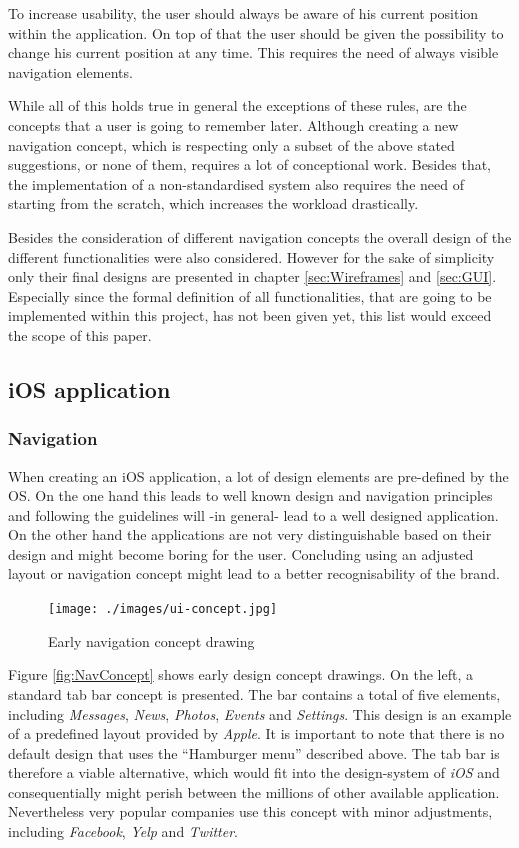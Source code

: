 To increase usability, the user should always be aware of his current position within the application. On top of that the user should be given the possibility to change his current position at any time. This requires the need of always visible navigation elements. 

While all of this holds true in general the exceptions of these rules, are the concepts that a user is going to remember later. Although creating a new navigation concept, which is respecting only a subset of the above stated suggestions, or none of them, requires a lot of conceptional work. Besides that, the implementation of a non-standardised system also requires the need of starting from the scratch, which increases the workload drastically. \cite{Hampton-Smith:2013aa}

Besides the consideration of different navigation concepts the overall design of the different functionalities were also considered. However for the sake of simplicity only their final designs are presented in chapter \vref{sec:Wireframes} and \vref{sec:GUI}. Especially since the formal definition of all functionalities, that are going to be implemented within this project, has not been given yet, this list would exceed the scope of this paper.

\subsection{iOS application}
\subsubsection{Navigation}
When creating an iOS application, a lot of design elements are pre-defined by the \acrlong{OS}. On the one hand this leads to well known design and navigation principles and following the guidelines will -in general- lead to a well designed application. On the other hand the applications are not very distinguishable based on their design and might become boring for the user. Concluding using an adjusted layout or navigation concept might lead to a better recognisability of the brand. 

\begin{figure}[h]
  	\centering
  	\texttt{[image: ./images/ui-concept.jpg]}
  	\caption[Early navigation concept drawing, own figure]{Early navigation concept drawing}
	\label{fig:NavConcept}
\end{figure}

Figure \vref{fig:NavConcept} shows early design concept drawings. On the left, a standard tab bar concept is presented. The bar contains a total of five elements, including \emph{Messages}, \emph{News}, \emph{Photos}, \emph{Events} and \emph{Settings}. This design is an example of a predefined layout provided by \emph{Apple}. It is important to note that there is no default design that uses the \enquote{Hamburger menu} described above. The tab bar is therefore a viable alternative, which would fit into the design-system of \emph{iOS} and consequentially might perish between the millions of other available application. Nevertheless very popular companies use this concept with minor adjustments, including \emph{Facebook}, \emph{Yelp} and \emph{Twitter}.

